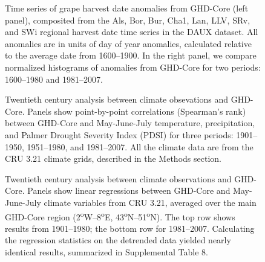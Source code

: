 \documentclass[final]{nature}
\begin{document}

\begin{figure}
\caption{Time series of grape harvest date anomalies from GHD-Core (left panel), composited from the Als, Bor, Bur, Cha1, Lan, LLV, SRv, and SWi regional harvest date time series in the DAUX dataset. All anomalies are in units of day of year anomalies, calculated relative to the average date from 1600--1900. In the right panel, we compare normalized histograms of anomalies from GHD-Core for two periods: 1600--1980 and 1981--2007.}
\end{figure}

\begin{figure}
\caption{Twentieth century analysis between climate obsevations and GHD-Core. Panels show point-by-point correlations (Spearman's rank) between GHD-Core and May-June-July temperature, precipitation, and Palmer Drought Severity Index (PDSI) for three periods: 1901--1950, 1951--1980, and 1981--2007. All the climate data are from the CRU 3.21 climate grids, described in the Methods section.}
\end{figure}

\begin{figure}
\caption{Twentieth century analysis between climate observations and GHD-Core. Panels show linear regressions between GHD-Core and May-June-July climate variables from CRU 3.21, averaged over the main GHD-Core region (2\textsuperscript{o}W--8\textsuperscript{o}E, 43\textsuperscript{o}N--51\textsuperscript{o}N). The top row shows results from 1901--1980; the bottom row for 1981--2007. Calculating the regression statistics on the detrended data yielded nearly identical results, summarized in Supplemental Table 8.}
\end{figure}
\end{document}
